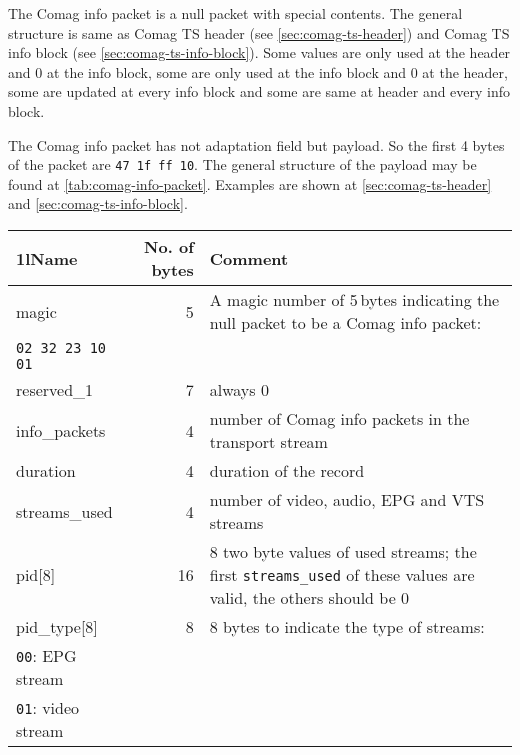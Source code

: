 \documentclass{scrartcl}
\providecommand*\toprule{\hline}
\providecommand*\midrule{\hline}
\begin{document}
The Comag info packet is a null packet with special contents. The general
structure is same as Comag TS header (see \autoref{sec:comag-ts-header}) and
Comag TS info block (see \autoref{sec:comag-ts-info-block}). Some values are
only used at the header and 0 at the info block, some are only used at the
info block and 0 at the header, some are updated at every info block and some
are same at header and every info block.

The Comag info packet has not adaptation field but payload. So the first 4
bytes of the packet are \texttt{47 1f ff 10}. The general structure of the
payload may be found at \autoref{tab:comag-info-packet}. Examples are shown at
\autoref{sec:comag-ts-header} and \autoref{sec:comag-ts-info-block}.

\begin{table}\small
  \begin{addmargin}[-4em]{-4em}
    \addtolength{\textwidth}{8em}
    \label{tab:comag-info-packet}
    \begin{tabularx}{\textwidth}{>{\ttfamily}lr>{\raggedright}X}
      \toprule
      \multicolumn1l{Name} & \hspace{-2em}No. of bytes & Comment
      \tabularnewline
      \midrule
      magic                &  5 & A magic number of 5\,bytes indicating the
                                  null packet to be a Comag info packet:\\
                                  \texttt{02 32 23 10 01}
                                  \tabularnewline
      reserved\_1          &  7 & always 0\tabularnewline
      info\_packets        &  4 & number of Comag info packets in the
                                  transport stream
                                  \tabularnewline
      duration             &  4 & duration of the record
                                  \tabularnewline
      streams\_used        &  4 & number of video, audio, EPG and VTS streams
                                  \tabularnewline
      pid[8]               & 16 & 8 two byte values of used streams;
                                  the first \texttt{streams\_used} of these
                                  values are valid, the others should be 0
                                  \tabularnewline
      pid\_type[8]         &  8 & 8 bytes to indicate the type of streams:\\
                                  \texttt{00}: EPG stream\\
                                  \texttt{01}: video stream\\

\end{tabularx}
\end{addmargin}
\end{table}
\end{document}
